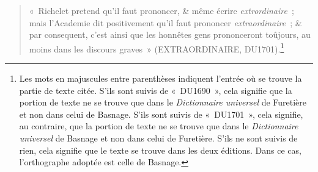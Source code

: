 \documentclass[output=paper,colorlinks,citecolor=brown,arabicfont,chinesefont,booklanguage=french]{langscibook}
\begin{document}
\begin{otherlanguage}{french}
\begin{quote}
    «~Richelet pretend qu’il faut prononcer, \& même écrire \emph{extrordinaire}~; mais l’Academie dit positivement qu’il faut prononcer \emph{extraordinaire}~; \& par con\-se\-quent, c’est ainsi que les honnêtes gens prononceront toûjours, au moins dans les discours graves~» (EXTRAORDINAIRE, DU1701).\footnote{Les mots en majuscules entre parenthèses indiquent l’entrée où se trouve la partie de texte citée. S'ils sont suivis de «~DU1690~», cela signifie que la portion de texte ne se trouve que dans le \emph{Dictionnaire universel} de Furetière et non dans celui de Basnage. S'ils sont suivis de «~DU1701~», cela signifie, au contraire, que la portion de texte ne se trouve que dans le \emph{Dictionnaire universel} de Basnage et non dans celui de Furetière. S'ils ne sont suivis de rien, cela signifie que le texte se trouve dans les deux éditions. Dans ce cas, l'orthographe adoptée est celle de Basnage.} 
\end{quote}


\end{otherlanguage}
\end{document}
